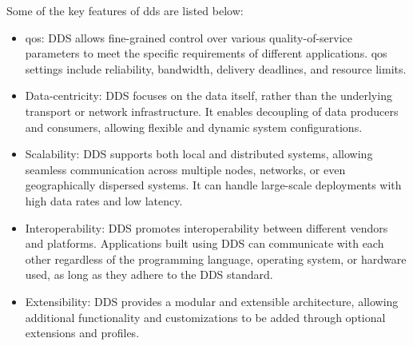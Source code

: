 Some of the key features of \gls{dds} are listed below:
\begin{itemize}
    \item \gls{qos}: DDS allows fine-grained control over various quality-of-service parameters to meet the specific requirements of different applications. \gls{qos} settings include reliability, bandwidth, delivery deadlines, and resource limits.

    \item Data-centricity: DDS focuses on the data itself, rather than the underlying transport or network infrastructure. It enables decoupling of data producers and consumers, allowing flexible and dynamic system configurations.

    \item Scalability: DDS supports both local and distributed systems, allowing seamless communication across multiple nodes, networks, or even geographically dispersed systems. It can handle large-scale deployments with high data rates and low latency.

    \item Interoperability: DDS promotes interoperability between different vendors and platforms. Applications built using DDS can communicate with each other regardless of the programming language, operating system, or hardware used, as long as they adhere to the DDS standard.

    \item Extensibility: DDS provides a modular and extensible architecture, allowing additional functionality and customizations to be added through optional extensions and profiles.

\end{itemize}
